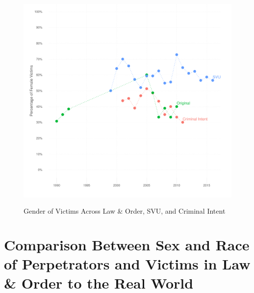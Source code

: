 \documentclass[12pt, letterpaper]{article}
\begin{document}
\begin{figure}[htbp]
\centering
\caption{Gender of Victims Across Law \& Order, SVU, and Criminal Intent}
\includegraphics[scale=.9]{../figs/all_victims_by_gender_ts.pdf}
\label{fig:victim_sex_ts}
\end{figure}

\clearpage
\section{Comparison Between Sex and Race of Perpetrators and Victims in Law \& Order to the Real World}
\label{si_tabs}



\clearpage


\clearpage


\clearpage

\end{document}
